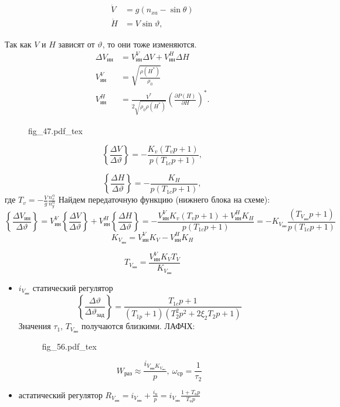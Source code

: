 \documentclass{article}
\newcommand{\incfig}[1]{
    {#1.pdf_tex}
}
\begin{document}
\begin{align*}
    \dot{V} & = g(n_{xa} - \sin{\theta}) \\
    \dot{H} & = V \sin{\vartheta} ,
\end{align*}

Так как $V$ и $H$ зависят от $\vartheta$, то они тоже изменяются.
\begin{align*}
    \Delta V_\text{ин} & = V_\text{ин}^V \Delta V + V_\text{ин}^H \Delta H
    \\
    V_\text{ин}^V      & = \sqrt{\frac{\rho(H^*)}{\rho_0}}
    \\
    V_\text{ин}^H      & = \frac{V^*}{2 \sqrt{\rho_0 \rho(H^*)}} \left(
    \frac{\partial P(H)}{\partial H} \right)^*.
\end{align*}

\begin{figure}[H]
    \centering
    \incfig{fig_47}
    \label{fig:fig_47}
\end{figure}

\[
    \left\{ \frac{\Delta V}{\Delta \vartheta} \right\} = - \frac{K_v(T_v p +
    1)}{p(T_{1c} p + 1)},
\]

\[
    \left\{ \frac{\Delta H}{\Delta \vartheta} \right\} = - \frac{K_H}{p(T_{1c}
    p + 1)},
\]
где $T_v = -\frac{V}{g} \frac{n_x^\alpha}{ n_y^\alpha}$
Найдем передаточную функцию (нижнего блока на схеме):
\[
    \left\{ \frac{\Delta V_\text{ин}}{\Delta \vartheta} \right\} =
    V_\text{ин}^V \left\{ \frac{\Delta V}{\Delta \vartheta} \right\} +
    V_\text{ин}^H \left\{ \frac{\Delta H }{\Delta \vartheta} \right\} = -
    \frac{ V_\text{ин}^V K_v (T_v p + 1) + V_\text{ин}^H K_H}{p(T_{1c} p + 1)}
    = -K_{ V_\text{ин}} \frac{(T_{ V_\text{ин}} p + 1)}{p (T_{1c} p +1)}
\]
\[
    K_{ V_\text{ин}} = V_\text{ин}^V K_V  - V_\text{ин}^H K_H
\]

\[
    T_{ V_\text{ин}}  =\frac{ V_\text{ин}^V K_V T_V}{ K_{ V_\text{ин}}}
\]
\begin{itemize}
    \item  $i_{ V_\text{ин}}$ статический регулятор
          \[
              \left\{ \frac{\Delta \vartheta}{\Delta \vartheta_\text{зад}}
              \right\} = \frac{T_{1c}p + 1}{ (T_{1p} + 1)( T_2^2 p^2 + 2 \xi_2
              T_2p + 1) }
          \]
          Значения $\tau_1$, $T_{ V_\text{ин}}$ получаются близкими.
          ЛАФЧХ:
          \begin{figure}[H]
              \centering
              \incfig{fig_56}
              \label{fig:fig_56}
          \end{figure}
          \[
              W_\text{раз} \approx \frac{i_{ V_\text{ин}K_{ V_\text{ин} }}}{p},
              \ \omega_\text{ср} = \frac{1}{\tau_2}
          \]
    \item астатический регулятор $R_{ V_\text{ин}} = i_{ V_\text{ин}} + \frac{
        i_u}{p} = i_{ V_\text{ин} } \frac{1 + T_u p }{T_u p}$
\end{itemize}
\end{document}
